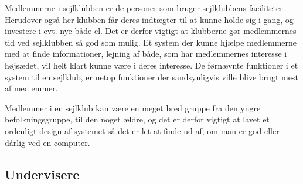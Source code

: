 Medlemmerne i sejlklubben er de personer som bruger sejlklubbens faciliteter. Herudover også her klubben får deres
indtægter til at kunne holde sig i gang, og investere i evt. nye både el. Det er derfor vigtigt at klubberne gør
medlemmernes tid ved sejlklubben så god som mulig. Et system der kunne hjælpe medlemmerne med at finde informationer,
lejning af både, som har medlemmernes interesse i højsædet, vil helt klart kunne være i deres interesse. De førnævnte
funktioner i et system til en sejlklub, er netop funktioner der sandsynligvis ville blive brugt mest af medlemmer.

Medlemmer i en sejlklub kan være en meget bred gruppe fra den yngre befolkningsgruppe, til den noget ældre, og det er
derfor vigtigt at lavet et ordenligt design af systemet så det er let at finde ud af, om man er god eller dårlig ved en
computer.





\subsection{Undervisere}


